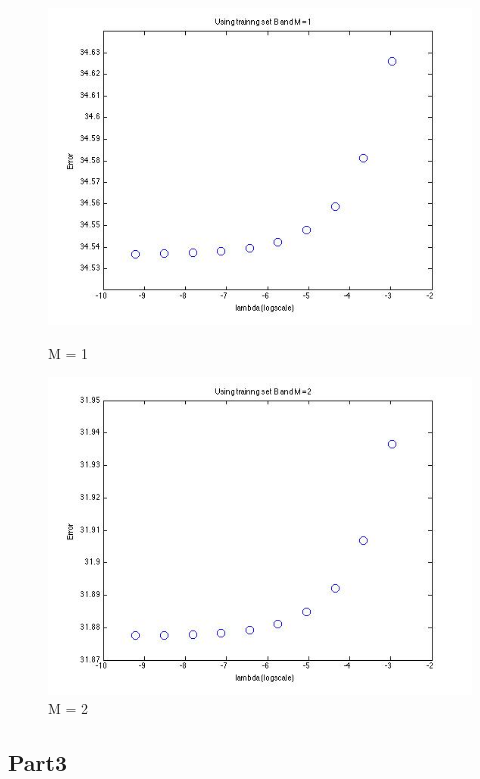 \begin{figure}[!htb]
                                                                                 \includegraphics[width=\linewidth]{figures/p4_LASSO_regressB_m=1}
  \caption{M = 1}
\endminipage\hfill
{}
  \includegraphics[width=\linewidth]{figures/p4_LASSO_regressB_m=2}
  \caption{M = 2}
\endminipage\hfill
\end{figure}






\subsection{Part3}

